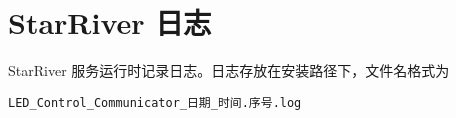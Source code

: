 \section{StarRiver 日志}\label{starriver-ux65e5ux5fd7}

StarRiver 服务运行时记录日志。日志存放在安装路径下，文件名格式为

\begin{verbatim}
LED_Control_Communicator_日期_时间.序号.log
\end{verbatim}
